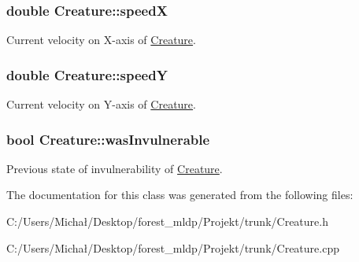 \subsubsection[{\texorpdfstring{speedX}{speedX}}]{\setlength{\rightskip}{0pt plus 5cm}double Creature\+::speedX\hspace{0.3cm}{\ttfamily [protected]}}\hypertarget{class_creature_acc2fb7ea8dd1145c4f6c9d9dc26d200b}{}\label{class_creature_acc2fb7ea8dd1145c4f6c9d9dc26d200b}
Current velocity on X-\/axis of \hyperlink{class_creature}{Creature}. 
\subsubsection[{\texorpdfstring{speedY}{speedY}}]{\setlength{\rightskip}{0pt plus 5cm}double Creature\+::speedY\hspace{0.3cm}{\ttfamily [protected]}}\hypertarget{class_creature_a13a98588ff3cc78bb9c2e05da185a843}{}\label{class_creature_a13a98588ff3cc78bb9c2e05da185a843}
Current velocity on Y-\/axis of \hyperlink{class_creature}{Creature}. 
\subsubsection[{\texorpdfstring{was\+Invulnerable}{wasInvulnerable}}]{\setlength{\rightskip}{0pt plus 5cm}bool Creature\+::was\+Invulnerable\hspace{0.3cm}{\ttfamily [protected]}}\hypertarget{class_creature_a344b50a9000c1ff0396c5d2ef771417e}{}\label{class_creature_a344b50a9000c1ff0396c5d2ef771417e}
Previous state of invulnerability of \hyperlink{class_creature}{Creature}. 

The documentation for this class was generated from the following files\+:\begin{DoxyCompactItemize}
\item 
C\+:/\+Users/\+Michał/\+Desktop/forest\+\_\+mldp/\+Projekt/trunk/Creature.\+h\item 
C\+:/\+Users/\+Michał/\+Desktop/forest\+\_\+mldp/\+Projekt/trunk/Creature.\+cpp\end{DoxyCompactItemize}
